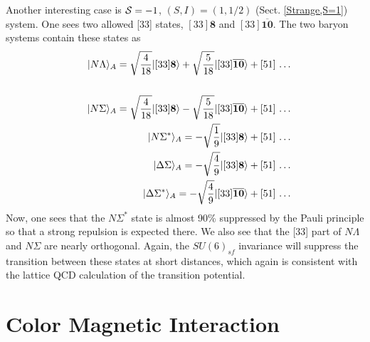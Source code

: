 \documentclass[aps,prd,showpacs,floatfix,reprint,nofootinbib]{revtex4-1}
\newcommand \cc[1]{{\bm {#1}}}
\newcommand \cb[1]{\overline{\bm {#1}}}
\begin{document}
Another interesting case is ${\cal S}=-1$, $(S, I)=(1,1/2)$ (Sect. \ref{Strange,S=1}) system.
One sees two allowed [33] states, $[33]\cc8$ and $[33]\cb{10}$.
The two baryon systems contain these states as
\begin{eqnarray}
&& |N\Lambda\rangle_A = \sqrt{\frac{4}{18}} |[33] \cc{8}\rangle + \sqrt{\frac{5}{18}} |[33] \cb{10}\rangle + \hbox{[51] \ldots}\\
&&\nonumber\\
&& |N\Sigma\rangle_A = \sqrt{\frac{4}{18}} |[33] \cc{8}\rangle - \sqrt{\frac{5}{18}} |[33] \cb{10}\rangle + \hbox{[51] \ldots}\\
&&  |N\Sigma^*\rangle_A = -\sqrt{\frac{1}{9}} |[33] \cc{8}\rangle  + \hbox{[51] \ldots}\\
&&  |\Delta\Sigma\rangle_A =  -\sqrt{\frac{4}{9}} |[33] \cc{8}\rangle  + \hbox{[51] \ldots}\\
&&  |\Delta\Sigma^*\rangle_A =- \sqrt{\frac{4}{9}} |[33] \cb{10}\rangle+ \hbox{[51] \ldots}
\end{eqnarray}
Now, one sees that the $N\Sigma^*$ state is almost 90\% suppressed by the Pauli principle 
so that a strong repulsion is expected there.
We also see that the [33] part of $N\Lambda$ and $N\Sigma$ are nearly orthogonal. 
Again, the $SU(6)_{sf}$ invariance will
suppress the transition between these states at short distances, which again is consistent with
the lattice QCD calculation of the transition potential\cite{Nemura:2018tay}.

\section{Color Magnetic Interaction}
\end{document}
